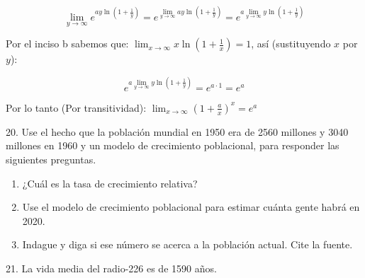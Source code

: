 \documentclass[12pt]{article}
\begin{document}
\begin{enumerate}[\hspace{9px} a)]
        \begin{equation*}
            \lim_{y \to \infty}e^{\displaystyle ay\ln\left(1+\frac{1}{y}\right)} = e^{\displaystyle\lim_{y \to \infty}ay\ln\left(1+\frac{1}{y}\right)} = e^{\displaystyle a\lim_{y \to \infty}y\ln\left(1+\frac{1}{y}\right)}
        \end{equation*}

        Por el inciso b sabemos que: \(\displaystyle\lim_{x \to \infty}x\ln\left(1+\frac{1}{x}\right)=1\), as\'i (sustituyendo $x$ por $y$):

        \begin{equation*}
            e^{a\displaystyle\lim_{y \to \infty}y\ln\left(1+\frac{1}{y}\right)} = e^{a\cdot1} = e^a
        \end{equation*}\medskip

        Por lo tanto (Por transitividad): \qquad
        \(\displaystyle\lim_{x \to \infty}\left(1+\frac{a}{x}\right)^x=e^a\)\bigskip

\end{enumerate}

20. Use el hecho que la poblaci\'on mundial en 1950 era de 2560 millones y 3040 millones en 1960 y un modelo de crecimiento poblacional, para responder las siguientes preguntas.

\begin{enumerate}[\hspace{9px} a)]
    \item ¿Cuál es la tasa de crecimiento relativa?

    \item Use el modelo de crecimiento poblacional para estimar cuánta gente habrá en 2020.

    \item Indague y diga si ese número se acerca a la población actual. Cite la fuente.

\end{enumerate}

21. La vida media del radio-226 es de 1590 años.
\end{document}
